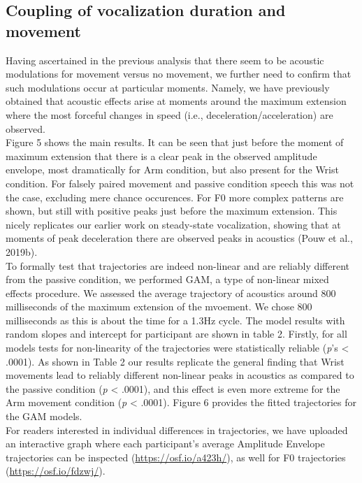 \documentclass[
  man, noextraspace,floatsintext]{apa6}
\begin{document}
\hypertarget{coupling-of-vocalization-duration-and-movement}{%
\subsection{Coupling of vocalization duration and movement}\label{coupling-of-vocalization-duration-and-movement}}

Having ascertained in the previous analysis that there seem to be acoustic modulations for movement versus no movement, we further need to confirm that such modulations occur at particular moments. Namely, we have previously obtained that acoustic effects arise at moments around the maximum extension where the most forceful changes in speed (i.e., deceleration/acceleration) are observed.\\
Figure 5 shows the main results. It can be seen that just before the moment of maximum extension that there is a clear peak in the observed amplitude envelope, most dramatically for Arm condition, but also present for the Wrist condition. For falsely paired movement and passive condition speech this was not the case, excluding mere chance occurences. For F0 more complex patterns are shown, but still with positive peaks just before the maximum extension. This nicely replicates our earlier work on steady-state vocalization, showing that at moments of peak deceleration there are observed peaks in acoustics (Pouw et al., 2019b).\\
To formally test that trajectories are indeed non-linear and are reliably different from the passive condition, we performed GAM, a type of non-linear mixed effects procedure. We assessed the average trajectory of acoustics around 800 milliseconds of the maximum extension of the mvoement. We chose 800 milliseconds as this is about the time for a 1.3Hz cycle. The model results with random slopes and intercept for participant are shown in table 2. Firstly, for all models tests for non-linearity of the trajectories were statistically reliable (\emph{p}'s \textless{} .0001). As shown in Table 2 our results replicate the general finding that Wrist movements lead to reliably different non-linear peaks in acoustics as compared to the passive condition (\emph{p} \textless{} .0001), and this effect is even more extreme for the Arm movement condition (\emph{p} \textless{} .0001). Figure 6 provides the fitted trajectories for the GAM models.\\
For readers interested in individual differences in trajectories, we have uploaded an interactive graph where each participant's average Amplitude Envelope trajectories can be inspected (\url{https://osf.io/a423h/}), as well for F0 trajectories (\url{https://osf.io/fdzwj/}).\\
\end{document}
